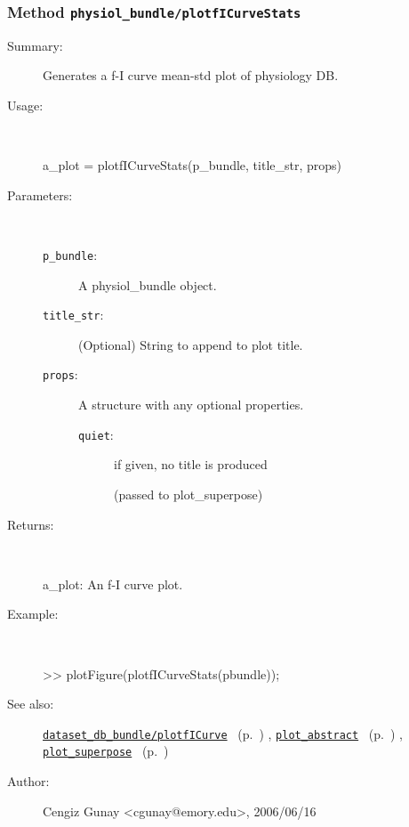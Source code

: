 \subsubsection[Method \texttt{plotfICurveStats}]{Method \texttt{physiol\_bundle/plotfICurveStats}}%
%
\label{ref_physiol_bundle__plotfICurveStats}%
\hypertarget{ref_physiol_bundle__plotfICurveStats}{}%
\begin{description}
\item[Summary:]Generates a f-I curve mean-std plot of physiology DB.
%
\item[Usage:]~%
\begin{lyxcode}%
a\_plot = plotfICurveStats(p\_bundle, title\_str, props)
%
\end{lyxcode}%
%
%
\item[Parameters:]~
\begin{description}%
\item[\texttt{p\_bundle}:]
 A physiol\_bundle object.
\item[\texttt{title\_str}:]
 (Optional) String to append to plot title.
\item[\texttt{props}:]
 A structure with any optional properties.
\begin{description}%
\item[\texttt{quiet}:]
 if given, no title is produced

(passed to plot\_superpose)
\end{description}%
\end{description}%
%
\item[Returns:
]~

	a\_plot: An f-I curve plot.
%
\item[Example:]~
\begin{lyxcode} >> plotFigure(plotfICurveStats(pbundle));
\\%
\end{lyxcode}
%
\item[See also:]%
\hyperlink{ref_dataset_db_bundle__plotfICurve}{\texttt{dataset\_db\_bundle/plotfICurve}}%
\ (p.~\pageref{ref_dataset_db_bundle__plotfICurve})%
%
, \hyperlink{ref_plot_abstract}{\texttt{plot\_abstract}}%
\ (p.~\pageref{ref_plot_abstract})%
%
, \hyperlink{ref_plot_superpose}{\texttt{plot\_superpose}}%
\ (p.~\pageref{ref_plot_superpose})%
%
%
\item[Author:]%
Cengiz Gunay <cgunay@emory.edu>, 2006/06/16
%
\end{description}
\methodline%
